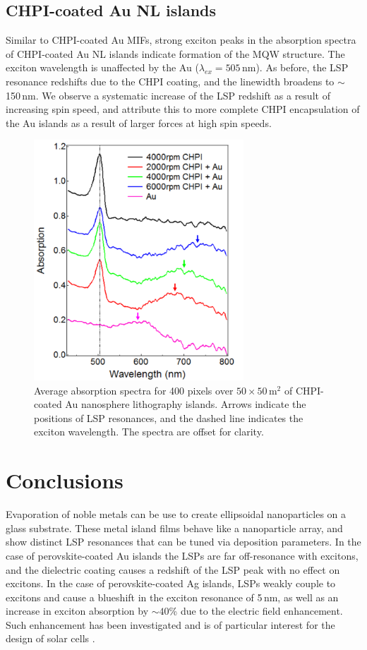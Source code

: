 \subsection{CHPI-coated Au NL islands}
Similar to CHPI-coated Au MIFs, strong exciton peaks in the absorption spectra of CHPI-coated Au NL islands indicate formation of the MQW structure. The exciton wavelength is unaffected by the Au ($\lambda_{ex} = 505$\,nm). As before, the LSP resonance redshifts due to the CHPI coating, and the linewidth broadens to $\sim$150\,nm. We observe a systematic increase of the LSP redshift as a result of increasing spin speed, and attribute this to more complete CHPI encapsulation of the Au islands as a result of larger forces at high spin speeds.
\begin{figure}[h!] 
\centering    
\includegraphics[width=0.7\textwidth]{Fig10}
\caption{Average absorption spectra for 400 pixels over $50\times50\,$\textmu m$^2$ of CHPI-coated Au nanosphere lithography islands. Arrows indicate the positions of LSP resonances, and the dashed line indicates the exciton wavelength. The spectra are offset for clarity.}
\label{6Fig10}
\end{figure}

\section{Conclusions}
Evaporation of noble metals can be use to create ellipsoidal nanoparticles on a glass substrate. These metal island films behave like a nanoparticle array, and show distinct LSP resonances that can be tuned via deposition parameters. In the case of perovskite-coated Au islands the LSPs are far off-resonance with excitons, and the dielectric coating causes a redshift of the LSP peak with no effect on excitons. In the case of perovskite-coated Ag islands, LSPs weakly couple to excitons and cause a blueshift in the exciton resonance of 5\,nm, as well as an increase in exciton absorption by $\sim40$\% due to the electric field enhancement. Such enhancement has been investigated and is of particular interest for the design of solar cells \cite{Alemu2014, Zheng2011, Xu2013, Spinelli2012}.

